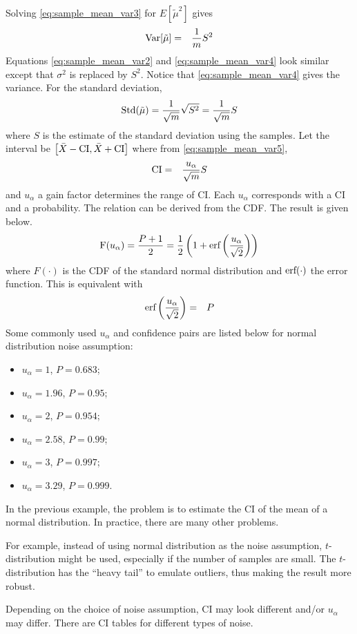 Solving \eqref{eq:sample_mean_var3} for $E[\tilde{\mu}^2]$ gives
\begin{eqnarray}
	\textup{Var}[\tilde{\mu}] &=& \dfrac{1}{m}S^2 \label{eq:sample_mean_var4}
\end{eqnarray}
Equations \eqref{eq:sample_mean_var2} and \eqref{eq:sample_mean_var4} look similar except that $\sigma^2$ is replaced by $S^2$. Notice that \eqref{eq:sample_mean_var4} gives the variance. For the standard deviation,
\begin{eqnarray}
	\textup{Std}(\tilde{\mu}) = \dfrac{1}{\sqrt{m}}\sqrt{S^2} = \dfrac{1}{\sqrt{m}}S \label{eq:sample_mean_var5}
\end{eqnarray} 
where $S$ is the estimate of the standard deviation using the samples. Let the interval be $\left[\bar{X}-\textup{CI}, \bar{X}+\textup{CI}\right]$ where from \eqref{eq:sample_mean_var5},
\begin{eqnarray}
	\textup{CI} &=& \dfrac{u_{\alpha}}{\sqrt{m}}S \label{eq:intervalci}
\end{eqnarray}
and $u_{\alpha}$ a gain factor determines the range of CI. Each $u_{\alpha}$ corresponds with a CI and a probability. The relation can be derived from the CDF. The result is given below.
\begin{eqnarray}
	\textup{F}(u_\alpha) = \dfrac{P+1}{2} = \dfrac{1}{2}\left(1+\textup{erf}\left(\dfrac{u_\alpha}{\sqrt{2}}\right)\right) \nonumber
\end{eqnarray}
where $F(\cdot)$ is the CDF of the standard normal distribution and $\textup{erf}(\cdot)$ the error function. This is equivalent with
\begin{eqnarray}
	\textup{erf}\left(\dfrac{u_\alpha}{\sqrt{2}}\right) &=& P \nonumber
\end{eqnarray}
Some commonly used $u_{\alpha}$ and confidence pairs are listed below for normal distribution noise assumption:
\begin{itemize}
	\item $u_{\alpha}=1$, $P=0.683$;
	\item $u_{\alpha}=1.96$, $P=0.95$;
	\item $u_{\alpha}=2$, $P=0.954$;
	\item $u_{\alpha}=2.58$, $P=0.99$;
	\item $u_{\alpha}=3$, $P=0.997$;
	\item $u_{\alpha}=3.29$, $P=0.999$.
\end{itemize}

In the previous example, the problem is to estimate the CI of the mean of a normal distribution. In practice, there are many other problems. 

For example, instead of using normal distribution as the noise assumption, $t$-distribution might be used, especially if the number of samples are small. The $t$-distribution has the ``heavy tail'' to emulate outliers, thus making the result more robust.

Depending on the choice of noise assumption, CI may look different and/or $u_{\alpha}$ may differ. There are CI tables for different types of noise.

